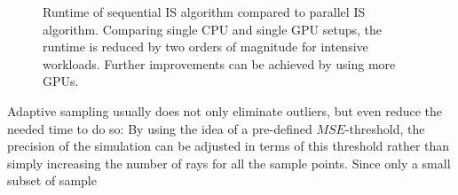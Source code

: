 \begin{figure}[H]
  \centerline{
  }
  \caption{Runtime of sequential IS algorithm compared to parallel
    IS algorithm.  Comparing single CPU and single GPU setups, the
    runtime is reduced by two orders of magnitude for intensive 
    workloads. Further improvements can be achieved by using more GPUs.}
\label{plot:runtime}
\end{figure}
Adaptive sampling usually does not only eliminate outliers, but even
reduce the needed time to do so: By using the idea of a pre-defined
$MSE$-threshold, the precision of the simulation can be adjusted in
terms of this threshold rather than simply increasing the number of
rays for all the sample points. Since only a small subset of sample
